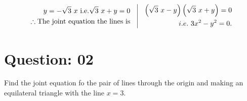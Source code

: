 \documentclass[17pt]{extarticle}
\begin{document}
\begin{fleqn}
\begin{equation} \nonumber
\begin{alignedat}{4}
y= -\sqrt{3}\ x \ \text {i.e.} \sqrt{3}\ x + y = 0 \\
\therefore \text {The joint equation the lines is}\\
\end{alignedat}
\quad
\vrule
\quad
\begin{alignedat}{4}
\left( \sqrt{3}\ x - y\right) \left( \sqrt{3}\ x + y\right) = 0 \\
i.e.\  3x^2 - y^2 = 0.
\end{alignedat}
\end{equation}


\section{Question: 02}
Find the joint equation fo the pair of lines through the origin and making an equilateral triangle with the line $x = 3.$



\end{fleqn}
\end{document}
